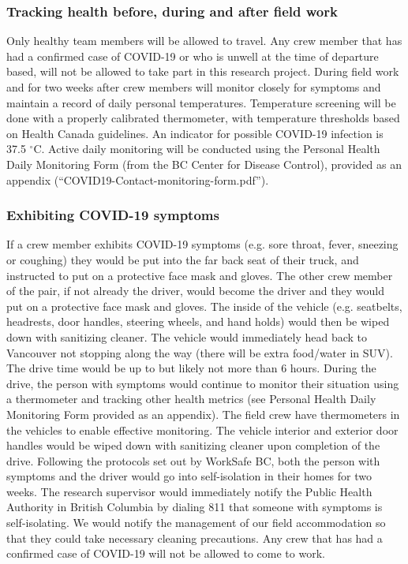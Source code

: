 \documentclass[11pt,letter]{article}
\begin{document}
\subsubsection {Tracking health before, during and after field work}
Only healthy team members will be allowed to travel. Any crew member that has had a confirmed case of COVID-19 or who is unwell at the time of departure based, will not be allowed to take part in this research project. During field work and for two weeks after crew members will monitor closely for symptoms and maintain a record of daily personal temperatures. Temperature screening will be done with a properly calibrated thermometer, with temperature thresholds based on Health Canada guidelines. An indicator for possible COVID-19 infection is 37.5 $^{\circ}$C. Active daily monitoring will be conducted using the Personal Health Daily Monitoring Form (from the BC Center for Disease Control), provided as an appendix (``COVID19-Contact-monitoring-form.pdf'').

\subsubsection{Exhibiting COVID-19 symptoms}
If a crew member exhibits COVID-19 symptoms (e.g. sore throat, fever, sneezing or coughing) they would be put into the far back seat of their truck, and instructed to put on a protective face mask and gloves. The other crew member of the pair, if not already the driver, would become the driver and they would put on a protective face mask and gloves. The inside of the vehicle (e.g. seatbelts, headrests, door handles, steering wheels, and hand holds) would then be wiped down with sanitizing cleaner. The vehicle would immediately head back to Vancouver not stopping along the way (there will be extra food/water in SUV). The drive time would be up to but likely not more than 6 hours. During the drive, the person with symptoms would continue to monitor their situation using a thermometer and tracking other health metrics (see Personal Health Daily Monitoring Form provided as an appendix). The field crew have thermometers in the vehicles to enable effective monitoring. The vehicle interior and exterior door handles would be wiped down with sanitizing cleaner upon completion of the drive. Following the protocols set out by WorkSafe BC, both the person with symptoms and the driver would go into self-isolation in their homes for two weeks. The research supervisor would immediately notify the Public Health Authority in British Columbia by dialing 811 that someone with symptoms is self-isolating. We would notify the management of our field accommodation so that they could take necessary cleaning precautions.  Any crew that has had a confirmed case of COVID-19 will not be allowed to come to work.
\end{document}
